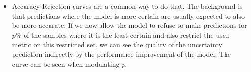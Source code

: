 \documentclass{article}
\begin{document}
\begin{itemize}
    \item Accuracy-Rejection curves are a common way to do that. The background is that predictions where the model is more certain are usually expected to also be more accurate. If we now allow the model to refuse to make predictions for $p$\% of the samples where it is the least certain and also restrict the used metric on this restricted set, we can see the quality of the uncertainty prediction indirectly by the performance improvement of the model. The curve can be seen when modulating $p$.
\end{itemize}



\end{document}
